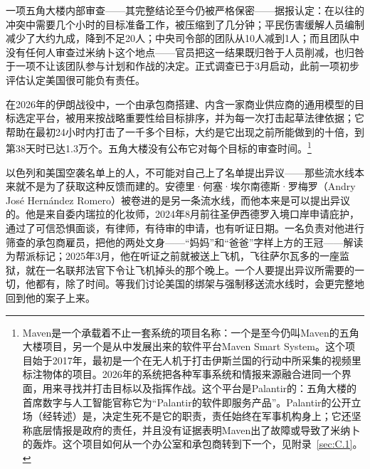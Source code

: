 一项五角大楼内部审查——其完整结论至今仍被严格保密——据报认定：在以往的冲突中需要几个小时的目标准备工作，被压缩到了几分钟；平民伤害缓解人员编制减少了大约九成，降到不足20人；中央司令部的团队从10人减到1人；而且团队中没有任何人审查过米纳卜这个地点——官员把这一结果既归咎于人员削减，也归咎于一项不让该团队参与计划和作战的决定\autocite{Bloomberg2026KillChain}。正式调查已于3月启动，此前一项初步评估认定美国很可能负有责任\autocite{NPR2026MinabProbe}。

在2026年的伊朗战役中，一个由承包商搭建、内含一家商业供应商的通用模型的目标选定平台，被用来按战略重要性给目标排序，并为每一次打击起草法律依据\autocite{livingstone2026maven}；它帮助在最初24小时内打击了一千多个目标，大约是它出现之前所能做到的十倍\autocite{csis2026maven}，到第38天时已达1.3万个\autocite{breakingdefense2026maven}。五角大楼没有公布它对每个目标的审查时间。\footnote{Maven是一个承载着不止一套系统的项目名称：一个是至今仍叫Maven的五角大楼项目，另一个是从中发展出来的软件平台Maven Smart System\autocite{csis2026maven}。这个项目始于2017年，最初是一个在无人机于打击伊斯兰国的行动中所采集的视频里标注物体的项目\autocite{weisgerber2017maven,fang2019maven}。2026年的系统把各种军事系统和情报来源融合进同一个界面，用来寻找并打击目标以及指挥作战\autocite{defensescoop2026transition}。这个平台是Palantir的：五角大楼的首席数字与人工智能官称它为“Palantir的软件即服务产品”\autocite{defensescoop2026transition}。Palantir的公开立场（经转述）是，决定生死不是它的职责，责任始终在军事机构身上\autocite{lee2026palantir}；它还坚称底层情报是政府的责任，并且没有证据表明Maven出了故障或导致了米纳卜的轰炸\autocite{Bloomberg2026KillChain}。这个项目如何从一个办公室和承包商转到下一个，见附录~\ref{sec:C.1}。}

以色列和美国空袭名单上的人，不可能对自己上了名单提出异议——那些流水线本来就不是为了获取这种反馈而建的。安德里·何塞·埃尔南德斯·罗梅罗（Andry José Hernández Romero）被卷进的是另一条流水线，而他本来是可以提出异议的。他是来自委内瑞拉的化妆师，2024年8月前往圣伊西德罗入境口岸申请庇护，通过了可信恐惧面谈，有律师，有待审的申请，也有听证日期\autocite{LULAC2025HernandezRomero,Vega2025HernandezRomero}。一名负责对他进行筛查的承包商雇员，把他的两处文身——“妈妈”和“爸爸”字样上方的王冠——解读为帮派标记\autocite{Palomera2025Blade}；2025年3月，他在听证之前就被送上飞机，飞往萨尔瓦多的一座监狱，就在一名联邦法官下令让飞机掉头的那个晚上\autocite{jgg2025contempt}。一个人要提出异议所需要的一切，他都有，除了时间。等我们讨论美国的绑架与强制移送流水线时，会更完整地回到他的案子上来。

